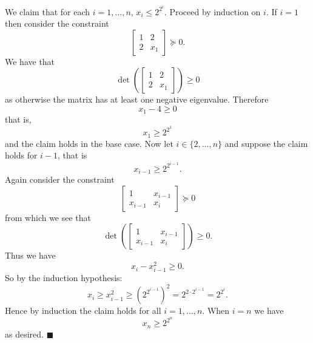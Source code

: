 \documentclass[letterpaper,12pt,oneside,onecolumn]{article}
\newcommand{\1}{\mathbbm{1}}
\begin{document}
\paragraph{}
We claim that for each $i = 1,\dots, n$, $x_i \leq 2^{2^{i}}$. Proceed by induction on $i$. If $i = 1$ then consider the constraint
$$\begin{bmatrix} 1 & 2 \\2 & x_1\end{bmatrix} \succcurlyeq 0.$$
We have that
$$\det(\begin{bmatrix} 1 & 2 \\2 & x_1\end{bmatrix}) \geq 0$$
as otherwise the matrix has at least one negative eigenvalue. Therefore
$$ x_1 - 4 \geq 0$$
that is,
$$ x_1 \geq 2^{2^1}$$
and the claim holds in the base case. Now let $i \in \{2,\dots, n\}$ and suppose the claim holds for $i-1$, that is
$$x_{i-1} \geq 2^{2^{i-1}}.$$
Again consider the constraint
$$ \begin{bmatrix} 1 & x_{i-1}\\ x_{i-1} & x_i \end{bmatrix} \succcurlyeq 0$$
from which we see that
$$\det( \begin{bmatrix} 1 & x_{i-1}\\ x_{i-1} & x_i \end{bmatrix}) \geq 0.$$
Thus we have 
$$x_i - x_{i-1}^2 \geq 0.$$
So by the induction hypothesis:
$$x_i \geq x_{i-1}^2 \geq (2^{2^{i-1}})^2 = 2^{2\cdot 2^{i-1}} = 2^{2^i}.$$
Hence by induction the claim holds for all $i = 1, \dots, n$. When $i = n$ we have
$$x_n \geq 2^{2^n}$$
as desired. $\blacksquare$
\end{document}
